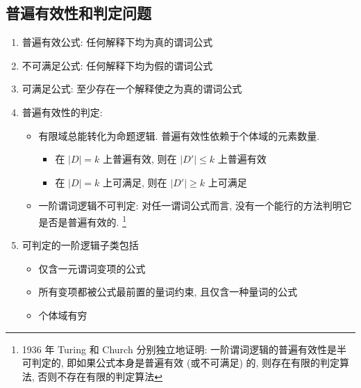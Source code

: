 \documentclass[11pt,a4paper,twocolumn,fleqn]{article} %
\begin{document}
\subsection{普遍有效性和判定问题} %
\label{sub:universal_validity}
\begin{enumerate}
	\item 普遍有效公式: 任何解释下均为真的谓词公式
	\item 不可满足公式: 任何解释下均为假的谓词公式
	\item 可满足公式: 至少存在一个解释使之为真的谓词公式
	\item 普遍有效性的判定: 
	\begin{itemize}
		\item 有限域总能转化为命题逻辑. 普遍有效性依赖于个体域的元素数量. 
		\begin{itemize}
			\item 在 $|D| = k$ 上普遍有效, 则在  $|D'|\le k$ 上普遍有效
			\item 在 $|D| = k$ 上可满足, 则在  $|D'|\ge k$ 上可满足
		\end{itemize}
		\item 一阶谓词逻辑不可判定: 对任一谓词公式而言, 
		没有一个能行的方法判明它是否是普遍有效的. 
	\footnote{1936 年 Turing 和 Church 分别独立地证明: 
	一阶谓词逻辑的普遍有效性是半可判定的, 即如果公式本身是普遍有效 
	(或不可满足) 的, 则存在有限的判定算法, 否则不存在有限的判定算法}
	\end{itemize} 
	\item 可判定的一阶逻辑子类包括
	\begin{itemize}
		\item 仅含一元谓词变项的公式
		\item 所有变项都被公式最前置的量词约束, 且仅含一种量词的公式
		\item 个体域有穷
	\end{itemize}
\end{enumerate}
\end{document}
